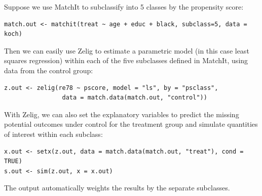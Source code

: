 \documentclass[11pt,titlepage]{article}
\begin{document}
Suppose we use MatchIt to subclassify into 5 classes by the propensity
score:
\begin{verbatim}
match.out <- matchit(treat ~ age + educ + black, subclass=5, data = koch)
\end{verbatim}
Then we can easily use Zelig to estimate a parametric model (in this
case least squares regression) within each of the five subclasses
defined in MatchIt, using data from the control group:
\begin{verbatim}
z.out <- zelig(re78 ~ pscore, model = "ls", by = "psclass", 
                data = match.data(match.out, "control"))
\end{verbatim}
With Zelig, we can also set the explanatory variables to predict the
missing potential outcomes under control for the treatment group and
simulate quantities of interest within each subclass:
\begin{verbatim}
x.out <- setx(z.out, data = match.data(match.out, "treat"), cond = TRUE)
s.out <- sim(z.out, x = x.out)
\end{verbatim}
The output automatically weights the results by the separate subclasses.
\baselineskip 

\end{document}
